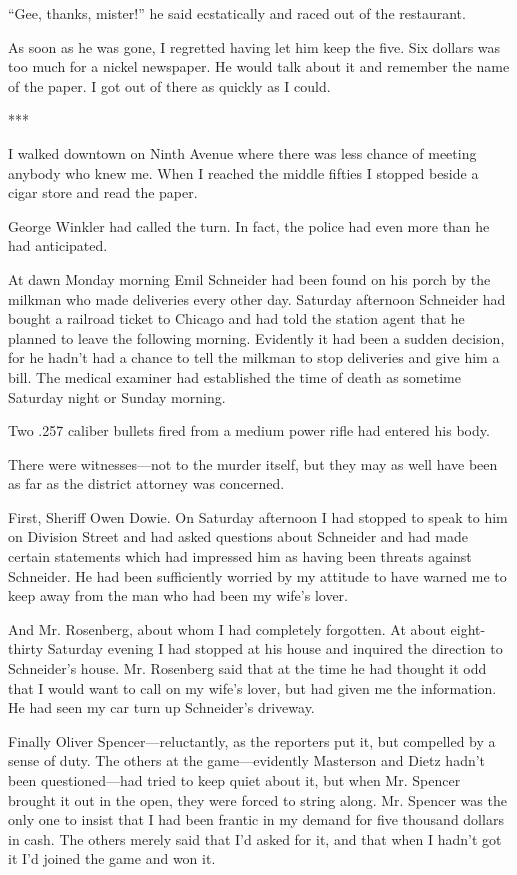 \documentclass{novel}
\begin{document}
{“Gee, thanks, mister!” he said ecstatically and raced out of the restaurant.

As soon as he was gone, I regretted having let him keep the five. Six dollars was too much for a nickel newspaper. He would talk about it and remember the name of the paper. I got out of there as quickly as I could.

***

I walked downtown on Ninth Avenue where there was less chance of meeting anybody who knew me. When I reached the middle fifties I stopped beside a cigar store and read the paper.

George Winkler had called the turn. In fact, the police had even more than he had anticipated.

At dawn Monday morning Emil Schneider had been found on his porch by the milkman who made deliveries every other day. Saturday afternoon Schneider had bought a railroad ticket to Chicago and had told the station agent that he planned to leave the following morning. Evidently it had been a sudden decision, for he hadn’t had a chance to tell the milkman to stop deliveries and give him a bill. The medical examiner had established the time of death as sometime Saturday night or Sunday morning.

Two .257 caliber bullets fired from a medium power rifle had entered his body.

There were witnesses—not to the murder itself, but they may as well have been as far as the district attorney was concerned.

First, Sheriff Owen Dowie. On Saturday afternoon I had stopped to speak to him on Division Street and had asked questions about Schneider and had made certain statements which had impressed him as having been threats against Schneider. He had been sufficiently worried by my attitude to have warned me to keep away from the man who had been my wife’s lover.

And Mr. Rosenberg, about whom I had completely forgotten. At about eight-thirty Saturday evening I had stopped at his house and inquired the direction to Schneider’s house. Mr. Rosenberg said that at the time he had thought it odd that I would want to call on my wife’s lover, but had given me the information. He had seen my car turn up Schneider’s driveway.

Finally Oliver Spencer—reluctantly, as the reporters put it, but compelled by a sense of duty. The others at the game—evidently Masterson and Dietz hadn’t been questioned—had tried to keep quiet about it, but when Mr. Spencer brought it out in the open, they were forced to string along. Mr. Spencer was the only one to insist that I had been frantic in my demand for five thousand dollars in cash. The others merely said that I’d asked for it, and that when I hadn’t got it I’d joined the game and won it.

}
\end{document}
